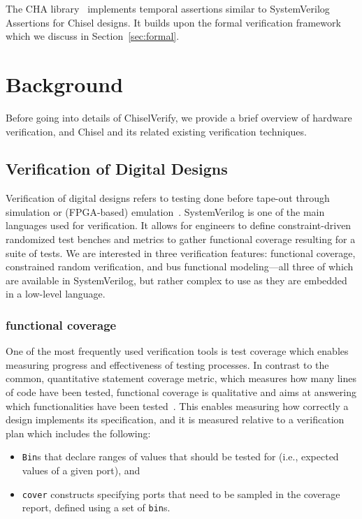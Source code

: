 \documentclass[conference]{IEEEtran}
\begin{document}
The CHA library~\cite{yu2022cha} implements temporal assertions
similar to SystemVerilog Assertions for Chisel designs.
It builds upon the formal verification framework which we discuss
in Section~\ref{sec:formal}.


\section{Background}
\label{sec:background}


Before going into details of ChiselVerify, we provide a brief overview of hardware verification, 
and Chisel and its related existing verification techniques.

\subsection{Verification of Digital Designs}

Verification of digital designs refers to testing done before tape-out through simulation 
or (FPGA-based) emulation~\cite{spear2008systemverilog}. SystemVerilog is one 
of the main languages used for verification. It allows for engineers to define constraint-driven 
randomized test benches and metrics to gather functional coverage resulting for a suite of 
tests. We are interested in three verification features: functional coverage, 
constrained random verification, and bus functional modeling---all three of which are available in 
SystemVerilog, but rather complex to use as they are embedded in a low-level language.

\subsubsection{functional coverage}
One of the most frequently used verification tools is test coverage which enables measuring 
progress and effectiveness of testing processes. In contrast to the common, quantitative statement 
coverage metric, which measures how many lines of code have been tested, functional coverage is 
qualitative and aims at answering which functionalities have been 
tested~\cite{spear2008systemverilog}. This enables measuring how correctly a design implements its 
specification, and it is measured relative to a verification plan which includes the following:

\begin{itemize}
  \item \texttt{Bin}s that declare ranges of values that should be tested for (i.e., expected values of a given port), and 
  \item \texttt{cover} constructs specifying ports that need to be sampled in the coverage report, defined using a set of \texttt{bin}s.
\end{itemize}
\end{document}
